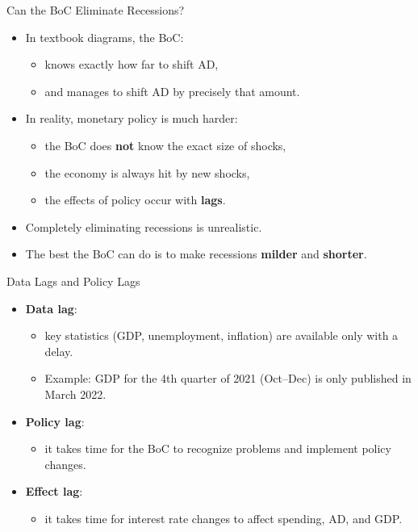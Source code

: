\documentclass[aspectratio=169]{beamer}
\begin{document}
\begin{frame}{Can the BoC Eliminate Recessions?}
\transfade
\begin{itemize}[<+->]
  \item In textbook diagrams, the BoC:
  \begin{itemize}[<+->]
    \item knows exactly how far to shift AD,
    \item and manages to shift AD by precisely that amount.
  \end{itemize}
  \item In reality, monetary policy is much harder:
  \begin{itemize}[<+->]
    \item the BoC does \textbf{not} know the exact size of shocks,
    \item the economy is always hit by new shocks,
    \item the effects of policy occur with \textbf{lags}.
  \end{itemize}
  \item Completely eliminating recessions is unrealistic.
  \item The best the BoC can do is to make recessions \textbf{milder} and \textbf{shorter}.
\end{itemize}
\end{frame}

\begin{frame}{Data Lags and Policy Lags}
\transfade
\begin{itemize}[<+->]
  \item \textbf{Data lag}:
  \begin{itemize}[<+->]
    \item key statistics (GDP, unemployment, inflation) are available only with a delay.
    \item Example: GDP for the 4th quarter of 2021 (Oct–Dec) is only published in March 2022.
  \end{itemize}
  \item \textbf{Policy lag}:
  \begin{itemize}[<+->]
    \item it takes time for the BoC to recognize problems and implement policy changes.
  \end{itemize}
  \item \textbf{Effect lag}:
  \begin{itemize}[<+->]
    \item it takes time for interest rate changes to affect spending, AD, and GDP.
  \end{itemize}
\end{itemize}
\end{frame}
\end{document}
